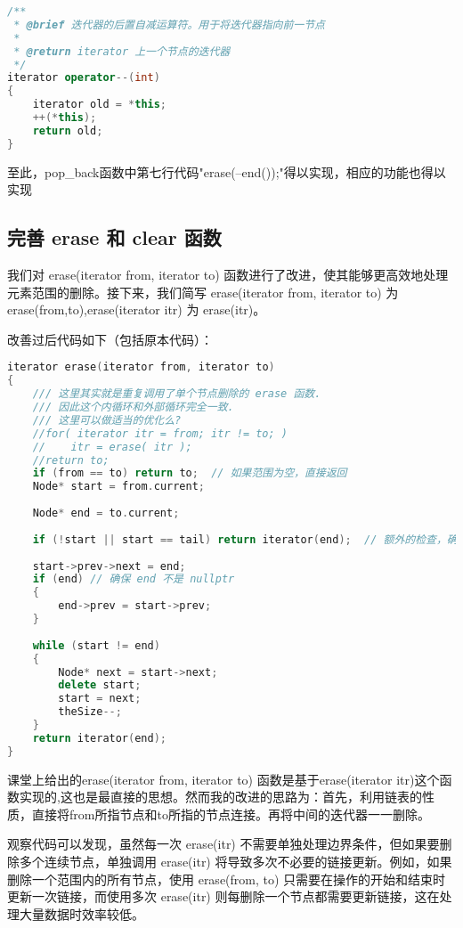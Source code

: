 \documentclass[fontset=fandol]{ctexart}
\begin{document}
\begin{lstlisting}[language=C++, caption={iterator的后置自减运算符实现}]  
/**
 * @brief 迭代器的后置自减运算符。用于将迭代器指向前一节点
 * 
 * @return iterator 上一个节点的迭代器
 */
iterator operator--(int)
{
    iterator old = *this;
    ++(*this);
    return old;
} 
\end{lstlisting}
至此，pop\_back函数中第七行代码"erase(--end());"得以实现，相应的功能也得以实现
  
\subsection{完善 erase 和 clear 函数}  
我们对 erase(iterator from, iterator to) 函数进行了改进，使其能够更高效地处理元素范围的删除。接下来，我们简写 erase(iterator from, iterator to) 为 erase(from,to),erase(iterator itr) 为 erase(itr)。

改善过后代码如下（包括原本代码）：

\begin{lstlisting}[language=C++, caption={erase(iterator from, iterator to)函数}]  
iterator erase(iterator from, iterator to)
{
    /// 这里其实就是重复调用了单个节点删除的 erase 函数.
    /// 因此这个内循环和外部循环完全一致. 
    /// 这里可以做适当的优化么?
    //for( iterator itr = from; itr != to; )
    //    itr = erase( itr );
    //return to;
    if (from == to) return to;  // 如果范围为空，直接返回    
    Node* start = from.current;    
    
    Node* end = to.current;    
    
    if (!start || start == tail) return iterator(end);  // 额外的检查，确保不会操作尾部之后的元素    
    
    start->prev->next = end;    
    if (end) // 确保 end 不是 nullptr
    {      
        end->prev = start->prev;    
    }    
    
    while (start != end) 
    {    
        Node* next = start->next;    
        delete start;    
        start = next;    
        theSize--;    
    }    
    return iterator(end);  
}  
\end{lstlisting}
课堂上给出的erase(iterator from, iterator to) 函数是基于erase(iterator itr)这个函数实现的,这也是最直接的思想。然而我的改进的思路为：首先，利用链表的性质，直接将from所指节点和to所指的节点连接。再将中间的迭代器一一删除。

观察代码可以发现，虽然每一次 erase(itr) 不需要单独处理边界条件，但如果要删除多个连续节点，单独调用 erase(itr) 将导致多次不必要的链接更新。例如，如果删除一个范围内的所有节点，使用 erase(from, to) 只需要在操作的开始和结束时更新一次链接，而使用多次 erase(itr) 则每删除一个节点都需要更新链接，这在处理大量数据时效率较低。
\end{document}
